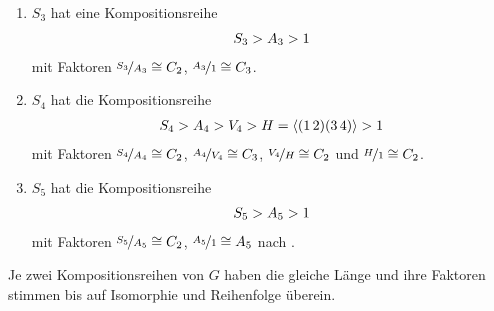 \begin{example}
	\begin{enumerate}[label=(\alph*)]
		\item $S_3$ hat eine Kompositionsreihe
		\begin{align}
			S_3 > A_3 > 1 \notag %
		\end{align}
		mit Faktoren $\nicefrac{S_3}{A_3} \cong C_2$, $\nicefrac{A_3}{1} \cong C_3$.
		\item $S_4$ hat die Kompositionsreihe
		\begin{align}
			S_4 > A_4 > V_4 > H=\langle (1\, 2)(3\, 4)\rangle > 1 \notag %
		\end{align}
		mit Faktoren $\nicefrac{S_4}{A_4} \cong C_2$, $\nicefrac{A_4}{V_4} \cong C_3$, $\nicefrac{V_4}{H} \cong C_2$ und $\nicefrac{H}{1}\cong C_2$.
		\item $S_5$ hat die Kompositionsreihe
		\begin{align}
			S_5 > A_5 > 1\notag %
		\end{align}
		mit Faktoren $\nicefrac{S_5}{A_5} \cong C_2$, $\nicefrac{A_5}{1} \cong A_5$ nach .
	\end{enumerate}
\end{example}

\begin{theorem}
	Je zwei Kompositionsreihen von $G$ haben die gleiche Länge und ihre Faktoren stimmen bis auf Isomorphie und Reihenfolge überein.
\end{theorem}

